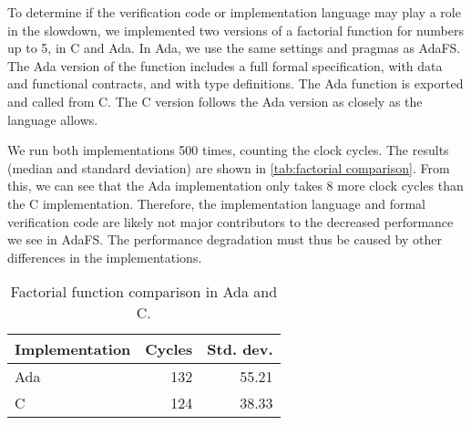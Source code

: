 To determine if the verification code or implementation language may play a role in the slowdown, we implemented two versions of a factorial function for numbers up to 5, in C and Ada.
In Ada, we use the same settings and pragmas as AdaFS.
The Ada version of the function includes a full formal specification, with data and functional contracts, and with type definitions.
The Ada function is exported and called from C.
The C version follows the Ada version as closely as the language allows.

We run both implementations 500 times, counting the clock cycles.
The results (median and standard deviation) are shown in \autoref{tab:factorial comparison}.
From this, we can see that the Ada implementation only takes 8 more clock cycles than the C implementation.
Therefore, the implementation language and formal verification code are likely not major contributors to the decreased performance we see in AdaFS.
The performance degradation must thus be caused by other differences in the implementations.

\begin{table}[h]
  \centering
  \begin{tabular}{l | r | r}
    Implementation & Cycles & Std. dev. \\
    \hline \hline
    Ada            & 132    & 55.21     \\
    C              & 124    & 38.33
  \end{tabular}
  \caption{Factorial function comparison in Ada and C.}
  \label{tab:factorial comparison}
\end{table}
\clearpage
